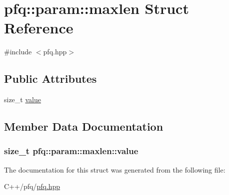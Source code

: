 \hypertarget{structpfq_1_1param_1_1maxlen}{\section{pfq\+:\+:param\+:\+:maxlen Struct Reference}
\label{structpfq_1_1param_1_1maxlen}
}


{\ttfamily \#include $<$pfq.\+hpp$>$}

\subsection*{Public Attributes}
\begin{DoxyCompactItemize}
\item 
size\+\_\+t \hyperlink{structpfq_1_1param_1_1maxlen_a693630abf4f41489a69836b661ea127d}{value}
\end{DoxyCompactItemize}


\subsection{Member Data Documentation}
\hypertarget{structpfq_1_1param_1_1maxlen_a693630abf4f41489a69836b661ea127d}{
\subsubsection[{value}]{\setlength{\rightskip}{0pt plus 5cm}size\+\_\+t pfq\+::param\+::maxlen\+::value}}\label{structpfq_1_1param_1_1maxlen_a693630abf4f41489a69836b661ea127d}


The documentation for this struct was generated from the following file\+:\begin{DoxyCompactItemize}
\item 
C++/pfq/\hyperlink{pfq_8hpp}{pfq.\+hpp}\end{DoxyCompactItemize}
